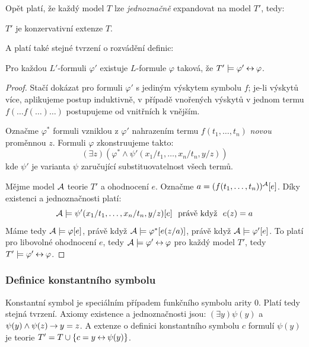 Opět platí, že každý model $T$ lze \emph{jednoznačně} expandovat na model $T'$, tedy:
\begin{corollary}
    $T'$ je konzervativní extenze $T$.
\end{corollary}

A platí také stejné tvrzení o rozvádění definic:

\begin{proposition}
    Pro každou $L'$-formuli $\varphi'$ existuje $L$-formule $\varphi$ taková, že $T'\models\varphi'\mathbin{\leftrightarrow}\varphi$.
\end{proposition}
\begin{proof}
    Stačí dokázat pro formuli $\varphi'$ s jediným výskytem symbolu $f$; je-li výskytů více, aplikujeme postup induktivně, v případě vnořených výskytů v jednom termu $f(\dots f(\dots)\dots)$ postupujeme od vnitřních k vnějším.

    Označme $\varphi^*$ formuli vzniklou z $\varphi'$ nahrazením termu $f(t_1,\dots,t_n)$ \emph{novou} proměnnou $z$. Formuli $\varphi$ zkonstruujeme takto:
    $$
    (\exists z)(\varphi^*\land \psi'(x_1/t_1,\dots,x_n/t_n,y/z))
    $$
    kde $\psi'$ je varianta $\psi$ zaručující substituovatelnost všech termů.

    Mějme model $\mathcal{A}$ teorie $T'$ a ohodnocení $e$. Označme $a=(f(t_1,\dots,t_n))^{\mathcal{A}}[e]$. Díky existenci a jednoznačnosti platí:
    $$
    \A\models\psi'(x_1/t_1,\dots,x_n/t_n,y/z)[e]\ \text{ právě když }\ e(z)=a 
    $$
    Máme tedy $\mathcal{A}\models\varphi[e]$, právě když $\mathcal{A}\models\varphi^*[e(z/a)]$, právě když $\mathcal{A}\models\varphi'[e]$. To platí pro libovolné ohodnocení $e$, tedy $\mathcal{A}\models\varphi'\mathbin{\leftrightarrow}\varphi$ pro každý model $T'$, tedy $T'\models\varphi'\mathbin{\leftrightarrow}\varphi$.
\end{proof}

\subsubsection*{Definice konstantního symbolu}

Konstantní symbol je speciálním případem funkčního symbolu arity $0$. Platí tedy stejná tvrzení. Axiomy existence a jednoznačnosti jsou: $(\exists y)\psi(y)$ a $\psi(y)\land\psi(z)\mathbin{\rightarrow} y=z$. A extenze o definici konstantního symbolu $c$ formulí $\psi(y)$ je teorie $T'=T\cup\{c=y\mathbin{\leftrightarrow} \psi(y)\}$.

